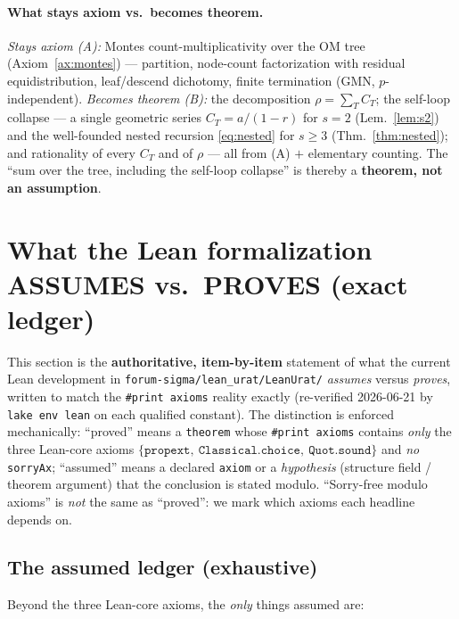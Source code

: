 \documentclass[11pt]{article}
\theoremstyle{definition}
\theoremstyle{remark}
\begin{document}
\paragraph{What stays axiom vs.\ becomes theorem.}
\emph{Stays axiom (A):} Montes count-multiplicativity over the OM tree
(Axiom~\ref{ax:montes}) --- partition, node-count factorization with residual
equidistribution, leaf/descend dichotomy, finite termination (GMN,
$p$-independent). \emph{Becomes theorem (B):} the decomposition
$\rho=\sum_T C_T$; the self-loop collapse --- a single geometric series $C_T=a/(1-r)$
for $s=2$ (Lem.~\ref{lem:s2}) and the well-founded nested recursion
\eqref{eq:nested} for $s\ge3$ (Thm.~\ref{thm:nested}); and rationality of every
$C_T$ and of $\rho$ --- all from (A) $+$ elementary counting. The ``sum over the
tree, including the self-loop collapse'' is thereby a \textbf{theorem, not an
assumption}.

\section{What the Lean formalization ASSUMES vs.\ PROVES (exact ledger)}\label{sec:ledger}

This section is the \textbf{authoritative, item-by-item} statement of what the
current Lean development in \texttt{forum-sigma/lean\_urat/LeanUrat/} \emph{assumes}
versus \emph{proves}, written to match the \texttt{\#print axioms} reality exactly
(re-verified 2026-06-21 by \texttt{lake env lean} on each qualified constant). The
distinction is enforced mechanically: ``proved'' means a \texttt{theorem} whose
\texttt{\#print axioms} contains \emph{only} the three Lean-core axioms
$\{\texttt{propext},\ \texttt{Classical.choice},\ \texttt{Quot.sound}\}$ and
\emph{no} \texttt{sorryAx}; ``assumed'' means a declared \texttt{axiom} or a
\emph{hypothesis} (structure field / theorem argument) that the conclusion is stated
modulo. ``Sorry-free modulo axioms'' is \emph{not} the same as ``proved'': we mark
which axioms each headline depends on.

\subsection{The assumed ledger (exhaustive)}\label{sec:assumed}

Beyond the three Lean-core axioms, the \emph{only} things assumed are:
\end{document}
